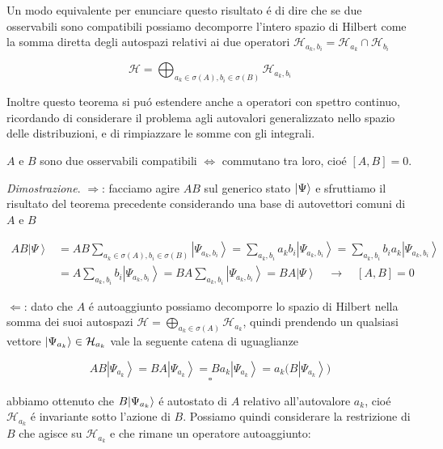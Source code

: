 Un modo equivalente per enunciare questo risultato \'e di dire che se due osservabili sono compatibili possiamo decomporre l'intero spazio di Hilbert come la somma diretta degli autospazi relativi ai due operatori $\mathcal{H}_{a_k, b_i} = \mathcal{H}_{a_k} \cap \mathcal{H}_{b_i}$

\begin{equation} 
	\mathcal{H}=\bigoplus_{a_{k}\in\sigma(A),b_{i}\in\sigma(B)}\mathcal{H}_{a_{k},b_{i}}
\end{equation}

Inoltre questo teorema si pu\'o estendere anche a operatori con spettro continuo, ricordando di considerare il problema agli autovalori generalizzato nello spazio delle distribuzioni, e di rimpiazzare le somme con gli integrali.
	
\begin{theorem}
	$A$ e $B$ sono due osservabili compatibili $\iff$ commutano tra loro, cio\'e $[A, B] = 0$.
\end{theorem} 
	
\textit{Dimostrazione}. $\Longrightarrow$: facciamo agire $AB$ sul generico stato $\ket{\Psi}$ e sfruttiamo il risultato del teorema precedente considerando una base di autovettori comuni di $A$ e $B$

\begin{align*} 
AB\left|\Psi\right\rangle
&=AB\sum_{a_{k}\in\sigma(A),b_{i}\in\sigma(B)}\left|\Psi_{a_{k},b_{i}}\right\rangle=\sum_{a_{k},b_{i}}a_{k}b_{i}\left|\Psi_{a_{k},b_{i}}\right\rangle=\sum_{a_{k},b_{i}}b_{i}a_{k}\left|\Psi_{a_{k},b_{i}}\right\rangle
\\ &=A\sum_{a_{k},b_{i}}b_{i}\left|\Psi_{a_{k},b_{i}}\right\rangle=BA\sum_{a_{k},b_{i}}\left|\Psi_{a_{k},b_{i}}\right\rangle=BA\left|\Psi\right\rangle\quad\longrightarrow\quad[A,B]=0
\end{align*}

$\Longleftarrow$: dato che $A$ \'e autoaggiunto possiamo decomporre lo spazio di Hilbert nella somma dei suoi autospazi $\mathcal{H} = \bigoplus_{a_k \in \sigma(A)} \mathcal{H}_{a_k}$, quindi prendendo un qualsiasi vettore $\ket{\Psi_{a_k}} \in \mathcal{H}_{a_k}$ vale la seguente catena di uguaglianze

$$A B\left|\Psi_{a_{k}}\right\rangle=B A\left|\Psi_{a_{k}}\right\rangle=B a_{k}\left|\Psi_{a_{k}}\right\rangle=a_{k}\big(B\left|\Psi_{a_{k}}\right\rangle\big)$$
$$\square$$

abbiamo ottenuto che $B \ket{\Psi_{a_k}}$ \'e autostato di $A$ relativo all'autovalore $a_k$, cio\'e $\mathcal{H}_{a_k}$ \'e invariante sotto l'azione di $B$. Possiamo quindi considerare la restrizione di $B$ che agisce su $\mathcal{H}_{a_k}$ e che rimane un operatore autoaggiunto:
	
